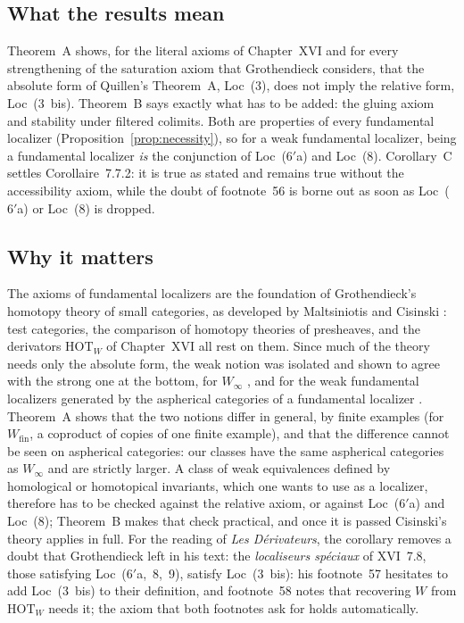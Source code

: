 \documentclass[11pt,a4paper]{article}
\theoremstyle{definition}
\newcommand{\Winf}{W_{\infty}}
\newcommand{\Wfin}{W_{\mathrm{fin}}}
\begin{document}
\subsection{What the results mean}\label{subsec:meaning}

Theorem~A shows, for the literal axioms of Chapter~XVI and for every strengthening of the
saturation axiom that Grothendieck considers, that the absolute form of Quillen's Theorem~A, Loc~(3), does
not imply the relative form, Loc~(3~bis). Theorem~B says exactly what
has to be added: the gluing axiom and stability under filtered colimits. Both are properties
of every fundamental localizer (Proposition~\ref{prop:necessity}), so for a weak fundamental
localizer, being a fundamental localizer \emph{is} the conjunction of Loc~($6'$a) and
Loc~(8). Corollary~C settles Corollaire~7.7.2: it is true as stated and remains true without
the accessibility axiom, while the doubt of footnote~56 is borne out as soon as Loc~($6'$a)
or Loc~(8) is dropped.

\subsection{Why it matters}\label{subsec:why}

The axioms of fundamental localizers are the foundation of Grothendieck's homotopy theory of
small categories, as developed by Maltsiniotis \cite{Mal05} and Cisinski \cite{Cis06}: test
categories, the comparison of homotopy theories of presheaves, and the derivators
$\mathrm{HOT}_W$ of Chapter~XVI all rest on them. Since much of the theory needs only the
absolute form, the weak notion was isolated and shown to agree with the strong one at the
bottom, for $\Winf$ \cite[Th.~6.1.18]{Cis06}, and for the weak fundamental localizers
generated by the aspherical categories of a fundamental localizer \cite[Cor.~6.1.17]{Cis06}.
Theorem~A shows that the two notions differ in general, by finite examples (for $\Wfin$, a
coproduct of copies of one finite example), and that the
difference cannot be seen on aspherical categories: our classes have the same aspherical
categories as $\Winf$ and are strictly larger. A class of weak equivalences defined by
homological or homotopical invariants, which one wants to use as a localizer, therefore has to
be checked against the relative axiom, or against Loc~($6'$a) and Loc~(8); Theorem~B makes
that check practical, and once it is passed Cisinski's theory applies in full. For the reading
of \emph{Les D\'erivateurs}, the corollary removes a doubt that Grothendieck left in his text:
the \emph{localiseurs sp\'eciaux} of XVI~7.8, those satisfying Loc~($6'$a,~8,~9), satisfy
Loc~(3~bis): his footnote~57 hesitates to add Loc~(3~bis) to their definition, and footnote~58
notes that recovering $W$ from $\mathrm{HOT}_W$ needs it; the axiom that both footnotes ask for
holds automatically.
\end{document}
